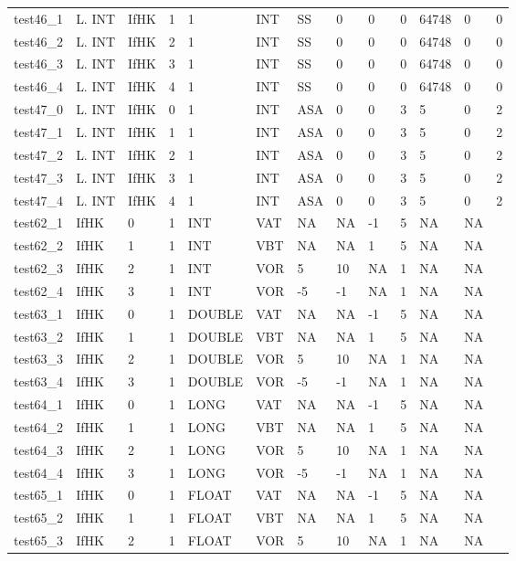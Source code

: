 \begin{longtable}{|l|l|l|p{0.5cm}|p{0.5cm}|l|p{0.5cm}|p{0.5cm}|p{0.5cm}|l|l|p{0.5cm}|l|}
test46\_1 & L. INT & IfHK & 1 & 1 & INT & SS & 0 & 0 & 0 & 64748 & 0 & 0 \\
test46\_2 & L. INT & IfHK & 2 & 1 & INT & SS & 0 & 0 & 0 & 64748 & 0 & 0 \\
test46\_3 & L. INT & IfHK & 3 & 1 & INT & SS & 0 & 0 & 0 & 64748 & 0 & 0 \\
test46\_4 & L. INT & IfHK & 4 & 1 & INT & SS & 0 & 0 & 0 & 64748 & 0 & 0 \\
test47\_0 & L. INT & IfHK & 0 & 1 & INT & ASA & 0 & 0 & 3 & 5 & 0 & 2 \\
test47\_1 & L. INT & IfHK & 1 & 1 & INT & ASA & 0 & 0 & 3 & 5 & 0 & 2 \\
test47\_2 & L. INT & IfHK & 2 & 1 & INT & ASA & 0 & 0 & 3 & 5 & 0 & 2 \\
test47\_3 & L. INT & IfHK & 3 & 1 & INT & ASA & 0 & 0 & 3 & 5 & 0 & 2 \\
test47\_4 & L. INT & IfHK & 4 & 1 & INT & ASA & 0 & 0 & 3 & 5 & 0 & 2 \\
test62\_1 & IfHK & 0 & 1 & INT & VAT & NA & NA & -1 & 5 & NA & NA \\
test62\_2 & IfHK & 1 & 1 & INT & VBT & NA & NA & 1 & 5 & NA & NA \\
test62\_3 & IfHK & 2 & 1 & INT & VOR & 5 & 10 & NA & 1 & NA & NA \\
test62\_4 & IfHK & 3 & 1 & INT & VOR & -5 & -1 & NA & 1 & NA & NA \\
test63\_1 & IfHK & 0 & 1 & DOUBLE & VAT & NA & NA & -1 & 5 & NA & NA \\
test63\_2 & IfHK & 1 & 1 & DOUBLE & VBT & NA & NA & 1 & 5 & NA & NA \\
test63\_3 & IfHK & 2 & 1 & DOUBLE & VOR & 5 & 10 & NA & 1 & NA & NA \\
test63\_4 & IfHK & 3 & 1 & DOUBLE & VOR & -5 & -1 & NA & 1 & NA & NA \\
test64\_1 & IfHK & 0 & 1 & LONG & VAT & NA & NA & -1 & 5 & NA & NA \\
test64\_2 & IfHK & 1 & 1 & LONG & VBT & NA & NA & 1 & 5 & NA & NA \\
test64\_3 & IfHK & 2 & 1 & LONG & VOR & 5 & 10 & NA & 1 & NA & NA \\
test64\_4 & IfHK & 3 & 1 & LONG & VOR & -5 & -1 & NA & 1 & NA & NA \\
test65\_1 & IfHK & 0 & 1 & FLOAT & VAT & NA & NA & -1 & 5 & NA & NA \\
test65\_2 & IfHK & 1 & 1 & FLOAT & VBT & NA & NA & 1 & 5 & NA & NA \\
test65\_3 & IfHK & 2 & 1 & FLOAT & VOR & 5 & 10 & NA & 1 & NA & NA \\

\end{longtable}
